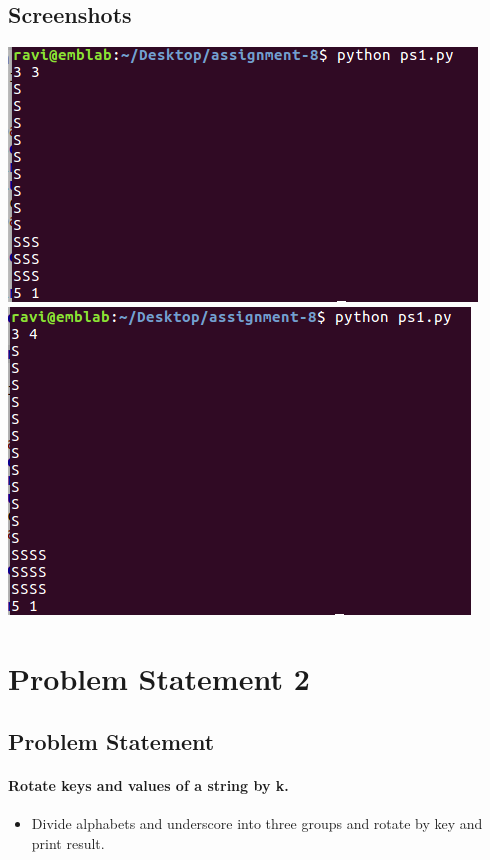 \documentclass[11pt]{article}
\begin{document}
{\subsection{Screenshots}
{
\begin{center}
\includegraphics[scale=0.70]{ss21.png}
\includegraphics[scale=0.70]{ss22.png}


\end{center}
\newpage
}



\section{Problem Statement 2}
{

\subsection{Problem Statement}
\paragraph{ Rotate keys and values of a string by k.} 
\begin{itemize}
\item Divide alphabets and underscore into three groups and rotate by key and print result.
\end{itemize}
} 

}
\end{document}
